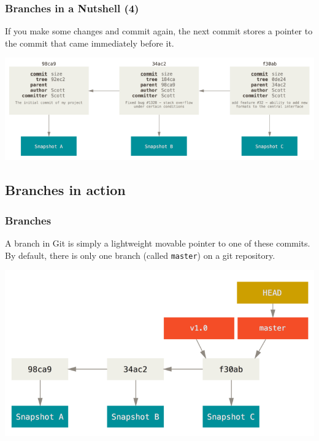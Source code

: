 \begin{frame}
  \frametitle{Branches in a Nutshell (4)}
If you make some changes and commit again, the next commit stores a pointer to the commit that came immediately before it.
  \vspace{1em}
  \begin{center}
    \includegraphics[width=\linewidth]{figures/commits-and-parents}
  \end{center}
\end{frame}

\subsection{Branches in action}

\begin{frame}
  \frametitle{Branches}

  A branch in Git is simply a lightweight movable pointer to one of these commits. By default, there is only one branch (called \texttt{master}) on a git repository.

  \begin{center}
    \includegraphics[width=\linewidth]{figures/branch-and-history}
  \end{center}

\end{frame}


